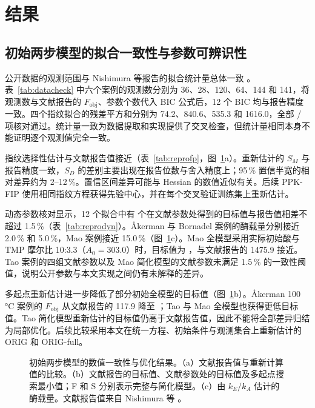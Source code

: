 \section{结果}
\subsection{初始两步模型的拟合一致性与参数可辨识性}\label{sec:repro}
公开数据的观测范围与 Nishimura 等报告的拟合统计量总体一致 \cite{nishimura2026}。表~\ref{tab:datacheck} 中六个案例的观测数分别为 36、28、120、64、144 和 141，将观测数与文献报告的 $F_\mathrm{obj}$、参数个数代入 BIC 公式后，12 个 BIC 均与报告精度一致。四个指纹拟合的残差平方和分别为 74.2、840.6、535.3 和 1616.0，全部 \NCheckPass{}/\NCheckAll{} 项核对通过。统计量一致为数据提取和实现提供了交叉检查，但统计量相同本身不能证明逐个观测值完全一致。

指纹选择性估计与文献报告值接近（表~\ref{tab:reprofp}，图~\ref{fig:repro}a）。重新估计的 $S_M$ 与报告精度一致，$S_D$ 的差别主要出现在报告位数与舍入精度上；95\,\% 置信半宽的相对差异约为 2--12\,\%。置信区间差异可能与 Hessian 的数值近似有关。后续 PPK-FIP 使用相同指纹方程获得先验中心，并在每个交叉验证训练集上重新估计。

动态参数核对显示，12 个拟合中有 \ReproConsistent{} 个在文献参数处得到的目标值与报告值相差不超过 1.5\,\%（表~\ref{tab:reprodyn}）。Åkerman 与 Bornadel 案例的酶载量分别接近 2.0\,\% 和 5.0\,\%，Mao 案例接近 15.0\,\%（图~\ref{fig:repro}c）。Mao 全模型采用实际初始酸与 TMP 摩尔比 10:3.3（$A_0=303.0$）时，目标值为 \MaoFullAtPaper，与文献报告的 1475.9 接近。Tao 案例的四组文献参数以及 Mao 简化模型的文献参数未满足 1.5\,\% 的一致性阈值，说明公开参数与本文实现之间仍有未解释的差异。

多起点重新估计进一步降低了部分初始全模型的目标值（图~\ref{fig:repro}b）。Åkerman 100\,°C 案例的 $F_\mathrm{obj}$ 从文献报告的 117.9 降至 \AkHundredFullGlobal；Tao 与 Mao 全模型也获得更低目标值。Tao 简化模型重新估计的目标值仍高于文献报告值，因此不能将全部差异归结为局部优化。后续比较采用本文在统一方程、初始条件与观测集合上重新估计的 ORIG 和 ORIG-full。
\begin{figure}[!htbp]\centering{}\caption{初始两步模型的数值一致性与优化结果。（a）文献报告值与重新计算值的比较。（b）文献报告的目标值、文献参数处的目标值及多起点搜索最小值；F 和 S 分别表示完整与简化模型。（c）由 $k_E/k_A$ 估计的酶载量。文献报告值来自 Nishimura 等 \cite{nishimura2026}。}\label{fig:repro}\end{figure}

